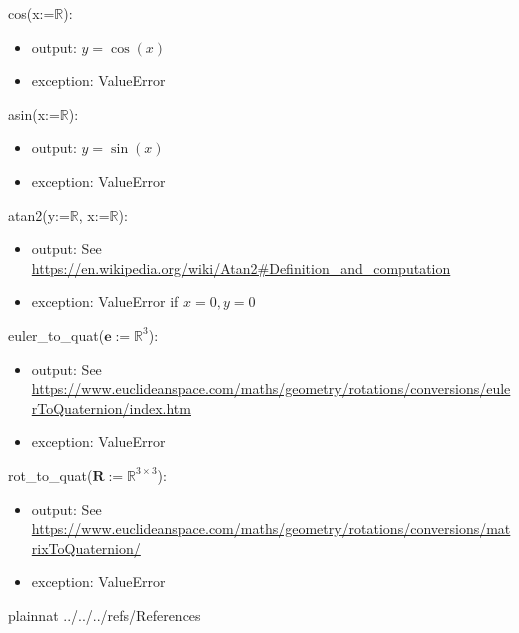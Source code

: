 \documentclass[12pt, titlepage]{article}
\begin{document}
\noindent cos(x:=$\mathbb{R}$):
\begin{itemize}
\item output: $y = \cos(x)$
\item exception: ValueError
\end{itemize}

\noindent asin(x:=$\mathbb{R}$):
\begin{itemize}
\item output: $y = \sin(x)$
\item exception: ValueError
\end{itemize}

\noindent atan2(y:=$\mathbb{R}$, x:=$\mathbb{R}$):
\begin{itemize}
\item output: See \url{https://en.wikipedia.org/wiki/Atan2#Definition_and_computation}
\item exception: ValueError if $x =0, y =0$
\end{itemize}

\noindent euler\_to\_quat($\mathbf{e}:=\mathbb{R}^3$):
\begin{itemize}
\item output: See \url{https://www.euclideanspace.com/maths/geometry/rotations/conversions/eulerToQuaternion/index.htm}
\item exception: ValueError
\end{itemize}

\noindent rot\_to\_quat($\mathbf{R} := \mathbb{R}^{3 \times 3}$):
\begin{itemize}
\item output: See \url{https://www.euclideanspace.com/maths/geometry/rotations/conversions/matrixToQuaternion/}
\item exception: ValueError
\end{itemize}

\newpage

 {plainnat}
 {../../../refs/References}

\end{document}
